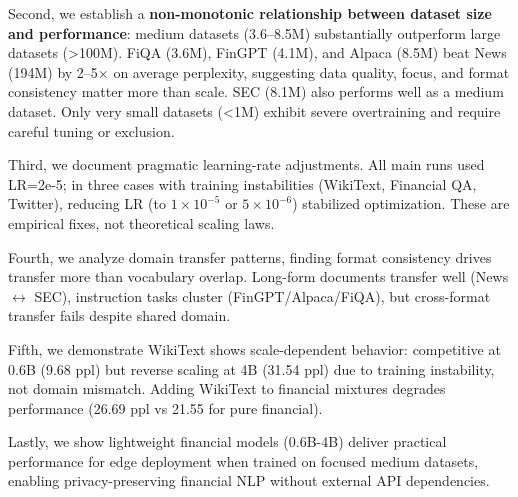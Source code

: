 Second, we establish a \textbf{non-monotonic relationship between dataset size and performance}: medium datasets (3.6–8.5M) substantially outperform large datasets (>100M). FiQA (3.6M), FinGPT (4.1M), and Alpaca (8.5M) beat News (194M) by 2–5$\times$ on average perplexity, suggesting data quality, focus, and format consistency matter more than scale. SEC (8.1M) also performs well as a medium dataset. Only very small datasets (<1M) exhibit severe overtraining and require careful tuning or exclusion.

Third, we document pragmatic learning-rate adjustments. All main runs used LR=2e-5; in three cases with training instabilities (WikiText, Financial QA, Twitter), reducing LR (to $1\times10^{-5}$ or $5\times10^{-6}$) stabilized optimization. These are empirical fixes, not theoretical scaling laws.

Fourth, we analyze domain transfer patterns, finding format consistency drives transfer more than vocabulary overlap. Long-form documents transfer well (News $\leftrightarrow$ SEC), instruction tasks cluster (FinGPT/Alpaca/FiQA), but cross-format transfer fails despite shared domain.

Fifth, we demonstrate WikiText shows scale-dependent behavior: competitive at 0.6B (9.68 ppl) but reverse scaling at 4B (31.54 ppl) due to training instability, not domain mismatch. Adding WikiText to financial mixtures degrades performance (26.69 ppl vs 21.55 for pure financial).

Lastly, we show lightweight financial models (0.6B-4B) deliver practical performance for edge deployment when trained on focused medium datasets, enabling privacy-preserving financial NLP without external API dependencies.
